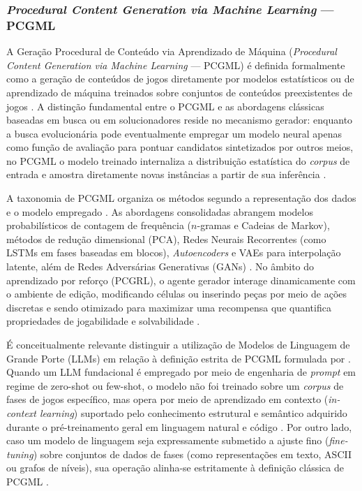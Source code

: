 \subsubsection{\textit{Procedural Content Generation via Machine Learning} --- PCGML}
\label{sec:pcgml}

A Geração Procedural de Conteúdo via Aprendizado de Máquina (\textit{Procedural Content Generation via Machine Learning} --- PCGML) é definida formalmente como a geração de conteúdos de jogos diretamente por modelos estatísticos ou de aprendizado de máquina treinados sobre conjuntos de conteúdos preexistentes de jogos \cite{summerville2018procedural}. A distinção fundamental entre o PCGML e as abordagens clássicas baseadas em busca ou em solucionadores reside no mecanismo gerador: enquanto a busca evolucionária pode eventualmente empregar um modelo neural apenas como função de avaliação para pontuar candidatos sintetizados por outros meios, no PCGML o modelo treinado internaliza a distribuição estatística do \textit{corpus} de entrada e amostra diretamente novas instâncias a partir de sua inferência \cite{summerville2018procedural}.

A taxonomia de PCGML organiza os métodos segundo a representação dos dados e o modelo empregado \cite{summerville2018procedural, maleki2024procedural}. As abordagens consolidadas abrangem modelos probabilísticos de contagem de frequência ($n$-gramas e Cadeias de Markov), métodos de redução dimensional (PCA), Redes Neurais Recorrentes (como LSTMs em fases baseadas em blocos), \textit{Autoencoders} e VAEs para interpolação latente, além de Redes Adversárias Generativas (GANs) \cite{summerville2018procedural, maleki2024procedural}. No âmbito do aprendizado por reforço (PCGRL), o agente gerador interage dinamicamente com o ambiente de edição, modificando células ou inserindo peças por meio de ações discretas e sendo otimizado para maximizar uma recompensa que quantifica propriedades de jogabilidade e solvabilidade \cite{khalifa2020pcgrl, maleki2024procedural}.

É conceitualmente relevante distinguir a utilização de Modelos de Linguagem de Grande Porte (LLMs) em relação à definição estrita de PCGML formulada por \textcite{summerville2018procedural}. Quando um LLM fundacional é empregado por meio de engenharia de \textit{prompt} em regime de zero-shot ou few-shot, o modelo não foi treinado sobre um \textit{corpus} de fases de jogos específico, mas opera por meio de aprendizado em contexto (\textit{in-context learning}) suportado pelo conhecimento estrutural e semântico adquirido durante o pré-treinamento geral em linguagem natural e código \cite{brown2020language, Gallotta_2024}. Por outro lado, caso um modelo de linguagem seja expressamente submetido a ajuste fino (\textit{fine-tuning}) sobre conjuntos de dados de fases (como representações em texto, ASCII ou grafos de níveis), sua operação alinha-se estritamente à definição clássica de PCGML \cite{summerville2018procedural, todd2023level}.

